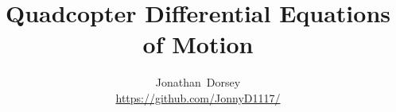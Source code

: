\documentclass[journal, onecolumn]{IEEEtran}
\begin{document}
\title{Quadcopter Differential Equations of Motion}
\author{Jonathan~Dorsey  \\  \url{https://github.com/JonnyD1117/}}


\maketitle












\printbibliography  
\end{document}
